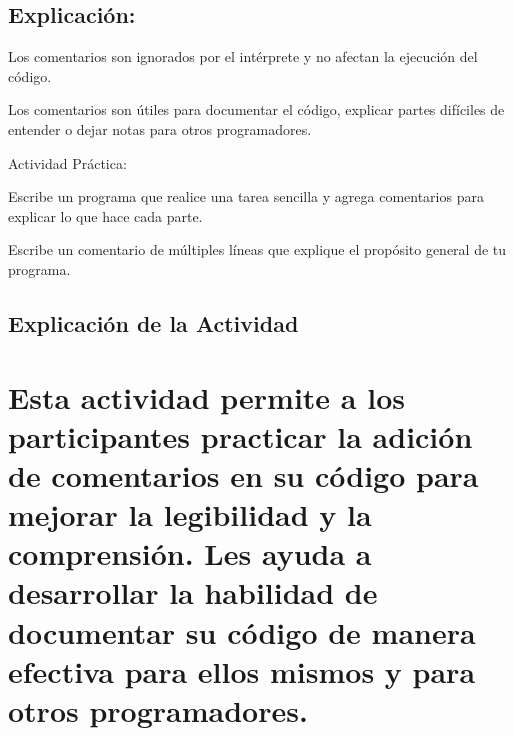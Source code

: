 \documentclass[
  a4paper,
  DIV=11,
  numbers=noendperiod,
  onepage,
  openany]{scrreprt}
\begin{document}
\hypertarget{explicaciuxf3n-8}{%
\section{Explicación:}\label{explicaciuxf3n-8}}

Los comentarios son ignorados por el intérprete y no afectan la
ejecución del código.

Los comentarios son útiles para documentar el código, explicar partes
difíciles de entender o dejar notas para otros programadores.

\begin{tcolorbox}[enhanced jigsaw, colbacktitle=quarto-callout-important-color!10!white, toprule=.15mm, leftrule=.75mm, titlerule=0mm, opacityback=0, rightrule=.15mm, opacitybacktitle=0.6, breakable, left=2mm, coltitle=black, title=\textcolor{quarto-callout-important-color}{\faExclamation}\hspace{0.5em}{Important}, toptitle=1mm, bottomtitle=1mm, arc=.35mm, bottomrule=.15mm, colback=white, colframe=quarto-callout-important-color-frame]

Actividad Práctica:

Escribe un programa que realice una tarea sencilla y agrega comentarios
para explicar lo que hace cada parte.

Escribe un comentario de múltiples líneas que explique el propósito
general de tu programa.

\end{tcolorbox}

\hypertarget{explicaciuxf3n-de-la-actividad-6}{%
\section{Explicación de la
Actividad}\label{explicaciuxf3n-de-la-actividad-6}}

\hypertarget{esta-actividad-permite-a-los-participantes-practicar-la-adiciuxf3n-de-comentarios-en-su-cuxf3digo-para-mejorar-la-legibilidad-y-la-comprensiuxf3n.-les-ayuda-a-desarrollar-la-habilidad-de-documentar-su-cuxf3digo-de-manera-efectiva-para-ellos-mismos-y-para-otros-programadores.}{%
\chapter{Esta actividad permite a los participantes practicar la adición
de comentarios en su código para mejorar la legibilidad y la
comprensión. Les ayuda a desarrollar la habilidad de documentar su
código de manera efectiva para ellos mismos y para otros
programadores.}\label{esta-actividad-permite-a-los-participantes-practicar-la-adiciuxf3n-de-comentarios-en-su-cuxf3digo-para-mejorar-la-legibilidad-y-la-comprensiuxf3n.-les-ayuda-a-desarrollar-la-habilidad-de-documentar-su-cuxf3digo-de-manera-efectiva-para-ellos-mismos-y-para-otros-programadores.}}
\end{document}
